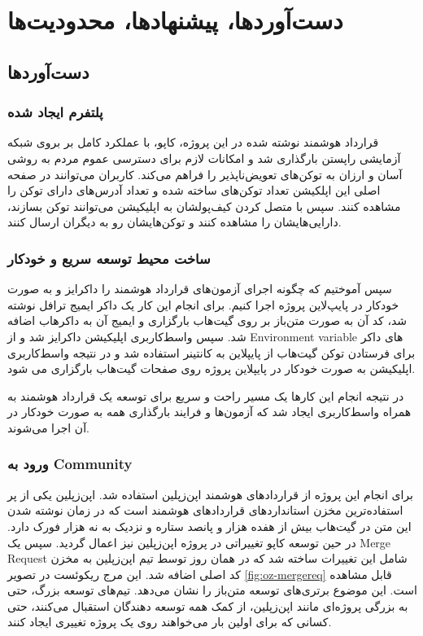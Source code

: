 \chapter{دست‌آوردها، پیشنهاد‌ها، محدودیت‌ها}

\section{دست‌آوردها}

\subsection{پلتفرم ایجاد شده}
قرارداد هوشمند نوشته شده در این پروژه،
کاپو، با عملکرد کامل بر بروی شبکه آزمایشی راپستن بارگذاری شد
و امکانات لازم برای دسترسی عموم مردم به روشی آسان و ارزان به توکن‌های تعویض‌ناپذیر را فراهم می‌کند.
کاربران می‌توانند در صفحه اصلی این اپلکیشن تعداد توکن‌های ساخته شده و تعداد آدرس‌های دارای توکن را مشاهده کنند.
سپس با متصل کردن کیف‌پولشان به اپلیکیشن می‌توانند توکن بسازند،
دارایی‌هایشان را مشاهده کنند و توکن‌هایشان رو به دیگران ارسال کنند.

\subsection{ساخت محیط توسعه سریع و خودکار}
سپس آموختیم که چگونه اجرای آزمون‌های قرارداد هوشمند را داکرایز و به صورت خودکار در پایپ‌لاین پروژه اجرا کنیم.
برای انجام این کار یک داکر ایمیج ترافل نوشته شد،
کد آن به صورت متن‌باز بر روی گیت‌هاب بارگزاری و ایمیج آن به داکرهاب اضافه شد. سپس واسط‌کاربری اپلیکیشن داکرایز شد و از
\gls{Environment variable}
های داکر برای فرستادن توکن گیت‌هاب از پایپلاین به کانتینر استفاده شد
و در نتیجه واسط‌کاربری اپلیکیشن به صورت خودکار در پایپلاین پروژه روی صفحات گیت‌هاب بارگزاری می شود.

در نتیجه انجام این کارها یک مسیر راحت و سریع برای توسعه یک قرارداد هوشمند به همراه واسط‌کاربری ایجاد شد که آزمون‌ها
و فرایند بارگذاری همه به صورت خودکار در آن اجرا می‌شوند.


\subsection{ورود به
\gls{Community}}
برای انجام این پروژه از قرارداد‌های هوشمند اپن‌زپلین استفاده شد.
اپن‌زپلین یکی از پر استفاده‌ترین مخزن استانداردهای قراردادهای هوشمند است
که در زمان نوشته شدن این متن در گیت‌هاب بیش از هفده هزار و پانصد ستاره و نزدیک به نه هزار فورک دارد.
در حین توسعه کاپو تغییراتی در پروژه اپن‌زپلین نیز اعمال گردید.
سپس یک
\gls{Merge Request}
شامل این تغییرات ساخته شد که در همان روز توسط تیم اپن‌زپلین به مخزن کد اصلی اضافه شد.
این مرج ریکوئست در تصویر
\ref{fig:oz-mergereq}
قابل مشاهده است.
این موضوع برتری‌های توسعه متن‌باز را نشان می‌دهد.
تیم‌های توسعه بزرگ، حتی به بزرگی پروژه‌ای مانند اپن‌زپلین، از کمک همه توسعه دهندگان استقبال می‌کنند،
حتی کسانی که برای اولین بار می‌خواهند روی یک پروژه تغییری ایجاد کنند.


